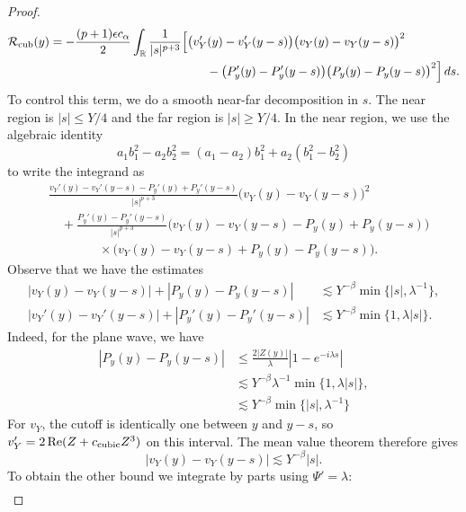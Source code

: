 \documentclass[11pt]{amsart}
\theoremstyle{definition}
\theoremstyle{remark}
\numberwithin{equation}{section}
\newcommand{\R}{\mathbb{R}}
\newcommand{\mc}[1]{\mathcal{#1}}
\begin{document}
\begin{proof}
    \begin{equation}\label{eqn:approx_cubic_remainder_translated}
        \begin{aligned}
            \mc{R}_{\textup{cub}}(y)
            &=-\frac{(p+1)\epsilon c_\alpha}{2}\int_{\R}\frac{1}{|s|^{p+3}}\Big[
            \bigl(v_Y'(y)-v_Y'(y-s)\bigr)\bigl(v_Y(y)-v_Y(y-s)\bigr)^2\\
            &\hspace{130pt}-\bigl(P_y'(y)-P_y'(y-s)\bigr)\bigl(P_y(y)-P_y(y-s)\bigr)^2\Big]\,ds.
        \end{aligned}
    \end{equation}
    To control this term, we do a smooth near-far decomposition in $s$. The near region is $|s| \leq Y/4$ and the far region is $|s| \geq Y/4$. In the near region, we use the algebraic identity
    \[a_1b_1^2 - a_2b_2^2 = (a_1-a_2)b_1^2 + a_2(b_1^2-b_2^2)\]
    to write the integrand as
    \begin{align*}
        &\frac{v_Y'(y)-v_Y'(y-s)-P_y'(y)+P_y'(y-s)}{|s|^{p+3}}
        \bigl(v_Y(y)-v_Y(y-s)\bigr)^2\\
        &\quad+\frac{P_y'(y)-P_y'(y-s)}{|s|^{p+3}}
        \bigl(v_Y(y)-v_Y(y-s)-P_y(y)+P_y(y-s)\bigr)\\
        &\qquad\qquad\times\bigl(v_Y(y)-v_Y(y-s)+P_y(y)-P_y(y-s)\bigr).
    \end{align*}
   Observe that we have the estimates
    \begin{align*}
        |v_Y(y)-v_Y(y-s)|+|P_y(y)-P_y(y-s)|
        &\lesssim Y^{-\beta}\min\{|s|,\lambda^{-1}\},\\
        |v_Y'(y)-v_Y'(y-s)|+|P_y'(y)-P_y'(y-s)|
        &\lesssim Y^{-\beta}\min\{1,\lambda|s|\}.
    \end{align*}
    Indeed, for the plane wave, we have
    \begin{align*}
        |P_y(y) - P_y(y - s)| & \leq \frac{2|Z(y)|}{\lambda}|1 - e^{-i\lambda s}| \\
        & \lesssim Y^{-\beta}\lambda^{-1}\min\{1,\lambda|s|\},\\
        & \lesssim Y^{-\beta} \min\{|s|, \lambda^{-1}\}
    \end{align*}
    For $v_Y$, the cutoff is identically one between $y$ and $y-s$, so $v_Y'=2\operatorname{Re}(Z+c_{\textup{cubic}}Z^3)$ on this interval. The mean value theorem therefore gives
    \[|v_Y(y)-v_Y(y-s)|\lesssim Y^{-\beta}|s|.\]
    To obtain the other bound we integrate by parts using $\Psi'=\lambda$:
    \begin{align*}

\end{align*}
\end{proof}
\end{document}
